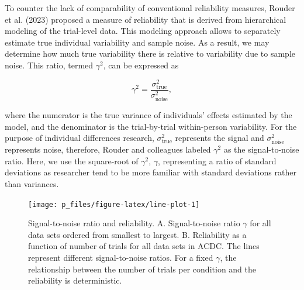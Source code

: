 \documentclass[
  man,floatsintext]{apa6}
\begin{document}
To counter the lack of comparability of conventional reliability measures, Rouder et al. (2023) proposed a measure of reliability that is derived from hierarchical modeling of the trial-level data. This modeling approach allows to separately estimate true individual variability and sample noise. As a result, we may determine how much true variability there is relative to variability due to sample noise. This ratio, termed \(\gamma^2\), can be expressed as

\[\gamma^2 = \frac{\sigma^2_{\text{true}}}{\sigma^2_{\text{noise}}},\]

where the numerator is the true variance of individuals' effects estimated by the model, and the denominator is the trial-by-trial within-person variability. For the purpose of individual differences research, \(\sigma^2_{\text{true}}\) represents the signal and \(\sigma^2_{\text{noise}}\) represents noise, therefore, Rouder and colleagues labeled \(\gamma^2\) as the signal-to-noise ratio. Here, we use the square-root of \(\gamma^2\), \(\gamma\), representing a ratio of standard deviations as researcher tend to be more familiar with standard deviations rather than variances.



\begin{figure}

{\centering \texttt{[image: p\_files/figure-latex/line-plot-1]} 

}

\caption{Signal-to-noise ratio and reliability. A. Signal-to-noise ratio \(\gamma\) for all data sets ordered from smallest to largest. B. Reliability as a function of number of trials for all data sets in ACDC. The lines represent different signal-to-noise ratios. For a fixed \(\gamma\), the relationship between the number of trials per condition and the reliability is deterministic.}\label{fig:line-plot}
\end{figure}
\end{document}
